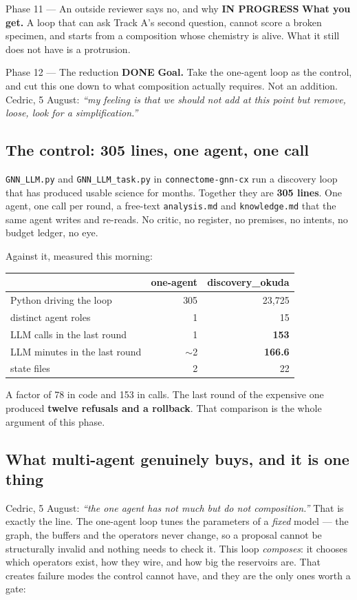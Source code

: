 \documentclass[11pt,a4paper]{article}
\newcommand{\code}[1]{\texttt{#1}}
\newcommand{\done}{\textcolor{good}{\textbf{DONE}}}
\newcommand{\prog}{\textcolor{warn}{\textbf{IN PROGRESS}}}
\begin{document}
\begin{phasebox}{Phase 11 --- An outside reviewer says no, and why \hfill \prog}
\textbf{What you get.} A loop that can ask Track A's second question, cannot score a broken
specimen, and starts from a composition whose chemistry is alive. What it still does not have is a
protrusion.
\end{phasebox}

\begin{phasebox}{Phase 12 --- The reduction \hfill \done}
\textbf{Goal.} Take the one-agent loop as the control, and cut this one down to what composition
actually requires. Not an addition. Cedric, 5 August: \emph{``my feeling is that we should not add
at this point but remove, loose, look for a simplification.''}

\subsection*{The control: 305 lines, one agent, one call}
\code{GNN\_LLM.py} and \code{GNN\_LLM\_task.py} in \code{connectome-gnn-cx} run a discovery loop
that has produced usable science for months. Together they are \textbf{305 lines}. One agent, one
call per round, a free-text \code{analysis.md} and \code{knowledge.md} that the same agent writes
and re-reads. No critic, no register, no premises, no intents, no budget ledger, no eye.

Against it, measured this morning:

\begin{center}\small
\begin{tabular}{lrr}
\toprule
 & one-agent & discovery\_okuda \\
\midrule
Python driving the loop        & 305   & 23{,}725 \\
distinct agent roles           & 1     & 15 \\
LLM calls in the last round    & 1     & \textbf{153} \\
LLM minutes in the last round  & $\sim$2 & \textbf{166.6} \\
state files                    & 2     & 22 \\
\bottomrule
\end{tabular}
\end{center}

\noindent A factor of 78 in code and 153 in calls. The last round of the expensive one produced
\textbf{twelve refusals and a rollback}. That comparison is the whole argument of this phase.

\subsection*{What multi-agent genuinely buys, and it is one thing}
Cedric, 5 August: \emph{``the one agent has not much but do not composition.''} That is exactly the
line. The one-agent loop tunes the parameters of a \emph{fixed} model --- the graph, the buffers and
the operators never change, so a proposal cannot be structurally invalid and nothing needs to check
it. This loop \emph{composes}: it chooses which operators exist, how they wire, and how big the
reservoirs are. That creates failure modes the control cannot have, and they are the only ones worth
a gate:


\end{phasebox}
\end{document}
